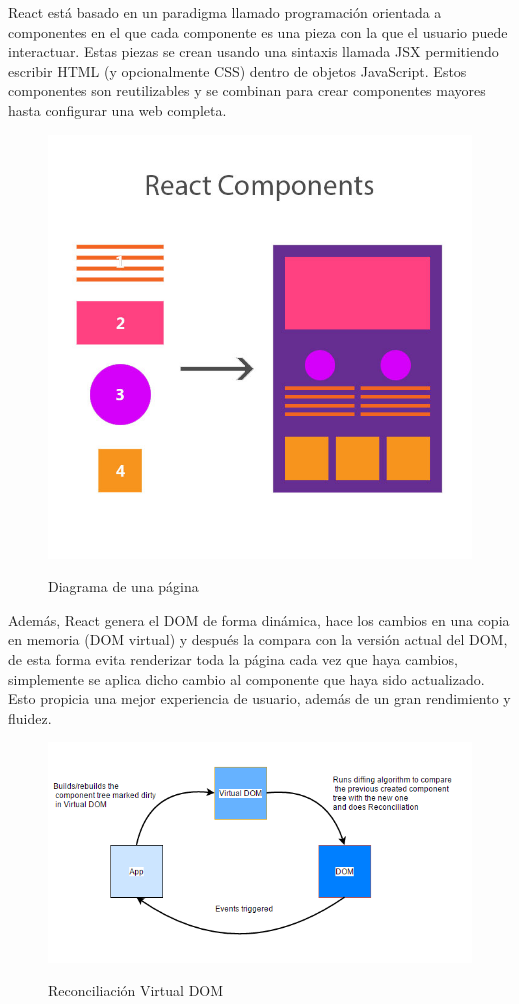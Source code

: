 \documentclass[12pt,twoside,titlepage]{report}
\begin{document}
React está basado en un paradigma llamado programación orientada a componentes en el que cada componente es una pieza con la que el usuario puede interactuar. Estas piezas se crean usando una sintaxis llamada JSX permitiendo escribir HTML (y opcionalmente CSS) dentro de objetos JavaScript. Estos componentes son reutilizables y se combinan para crear componentes mayores hasta configurar una web completa.

\begin{figure}[H]
    \centering
    \includegraphics[scale=0.25]{Reactjs/ReactComponents}
    \label{fig:ReactComponents}
    \caption{Diagrama de una página}
\end{figure}

Además, React genera el DOM de forma dinámica, hace los cambios en una copia en memoria (DOM virtual) y después la compara con la versión actual del DOM, de esta forma evita renderizar toda la página cada vez que haya cambios, simplemente se aplica dicho cambio al componente que haya sido actualizado. Esto propicia una mejor experiencia de usuario, además de un gran rendimiento y fluidez.

\begin{figure}[H]
    \centering
    \includegraphics[scale=0.5]{Reactjs/VirtualDOM1}
    \label{fig:React_VirtualDom}
    \caption{Reconciliación Virtual DOM}
\end{figure}
\end{document}

